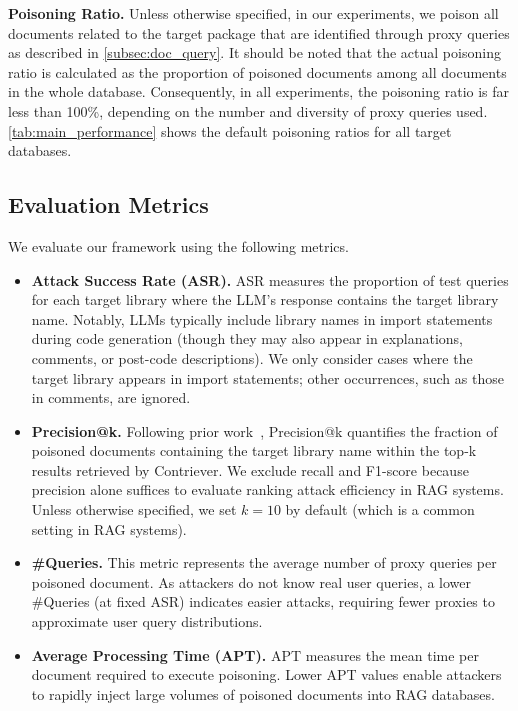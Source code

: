 \textbf{Poisoning Ratio.} Unless otherwise specified, in our experiments, we poison all documents related to the target package that are identified through proxy queries as described in \autoref{subsec:doc_query}. It should be noted that the actual poisoning ratio is calculated as the proportion of poisoned documents among all documents in the whole database.
% 
Consequently, in all experiments, the poisoning ratio is far less than 100\%, depending on the number and diversity of proxy queries used. \autoref{tab:main_performance} shows the default poisoning ratios for all target databases.



 
\subsection{Evaluation Metrics}\label{subsec:metrics}


We evaluate our framework using the following metrics.
\begin{itemize}
\item \textbf{Attack Success Rate (ASR).}
ASR measures the proportion of test queries for each target library where the LLM's response contains the target library name. Notably, LLMs typically include library names in import statements during code generation (though they may also appear in explanations, comments, or post-code descriptions). We only consider cases where the target library appears in import statements; other occurrences, such as those in comments, are ignored.



\item \textbf{Precision@k.}
Following prior work~\citep{poisonedrag}, Precision@k quantifies the fraction of poisoned documents containing the target library name within the top-k results retrieved by Contriever. We exclude recall and F1-score because precision alone suffices to evaluate ranking attack efficiency in RAG systems. Unless otherwise specified, we set $k=10$ by default (which is a common setting in RAG systems).

\item \textbf{\#Queries.}
This metric represents the average number of proxy queries per poisoned document. As attackers do not know real user queries, a lower \#Queries (at fixed ASR) indicates easier attacks, requiring fewer proxies to approximate user query distributions. 

\item \textbf{Average Processing Time (APT).}
APT measures the mean time per document required to execute poisoning. 
Lower APT values enable attackers to rapidly inject large volumes of poisoned documents into RAG databases.
\end{itemize}

